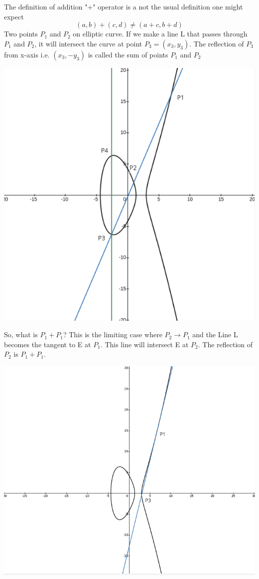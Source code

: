 \documentclass[12pt,a4paper]{report}
\begin{document}
The definition of addition "$+$" operator is a not the usual definition one might expect 
$$(a,b)+(c,d) \neq (a+c,b+d)$$
Two points $P_1$ and $P_2$ on elliptic curve. If we make a line L that passes through $P_1$ and $P_2$, it will intersect the curve at point $P_3=(x_3,y_3)$. The reflection of $P_3$ from x-axis i.e. $(x_3,-y_3)$ is called the sum of points $P_1$ and $P_2$
\begin{center}
\includegraphics[scale=0.4]{2}
\end{center}
So, what is $P_1+P_1$? This is the limiting case where $P_2 \to P_1$ and the Line L becomes the tangent to E at $P_1$. This line will intersect E at $P_2$. The reflection of $P_2$ is $P_1+P_1$.
\begin{center}
\includegraphics[scale=0.4]{3}
\end{center}
\end{document}
